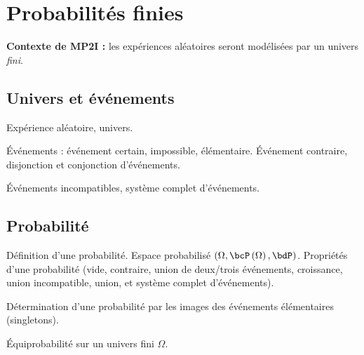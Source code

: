 \documentclass[a4paper,french,bookmarks]{article}
\begin{document}

    \section*{Probabilités finies}

    \begin{center}
        \begin{minipage}{0.8\linewidth}
            \begin{tcolorbox}[
                breakable,
                enhanced,
                interior style      = {left color=main4!15,right color=main2!12},
                borderline north    = {.5pt}{0pt}{main2!10},
                borderline south    = {.5pt}{0pt}{main2!10},
                borderline west     = {.5pt}{0pt}{main2!10},
                borderline east     = {.5pt}{0pt}{main2!10},
                sharp corners       = downhill,
                arc                 = 0 cm,
                boxrule             = 0.5pt,
                drop fuzzy shadow   = black!40!white,
                nobeforeafter,
            ]
                \centering\textbf{\sffamily Contexte de MP2I :} les expériences aléatoires
                seront modélisées par un univers \textit{fini}.
            \end{tcolorbox}
        \end{minipage}
    \end{center}

    \subsection*{Univers et événements}

    \begin{enumerate}
        \ithand Expérience aléatoire, univers.
    
        \ithand Événements : événement certain, impossible, élémentaire. Événement contraire, disjonction et conjonction d'événements.

        \ithand Événements incompatibles, système complet d'événements.
    \end{enumerate}

    \subsection*{Probabilité}

    \begin{enumerate}
        \ithand Définition d'une probabilité. Espace probabilisé $\left(\Omega,
        \bcP\left(\Omega\right),\bdP\right)$. Propriétés d'une probabilité (vide, contraire,
        union de deux/trois événements, croissance, union incompatible, union, et système
        complet d'événements).
        
        \ithand Détermination d'une probabilité par les images des événements élémentaires
        (singletons).
        
        \ithand Équiprobabilité sur un univers fini $\Omega$.
    \end{enumerate}
\end{document}
